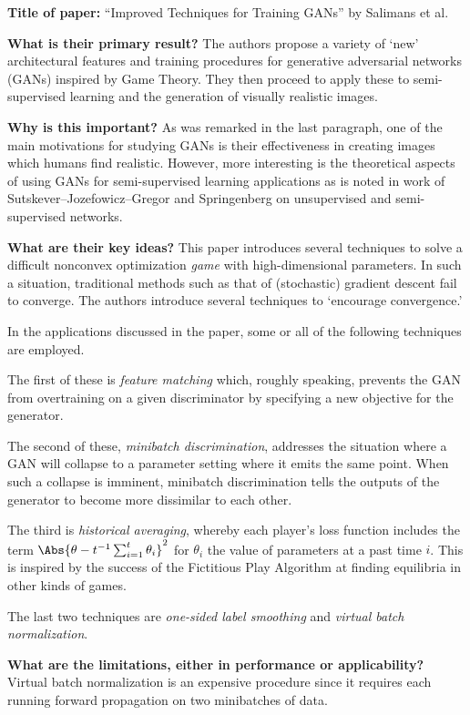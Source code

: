 \noindent \textbf{Title of paper:} ``Improved Techniques for Training GANs'' by
Salimans et al.

\noindent\textbf{What is their primary result?} The authors propose a variety of
`new' architectural features and training procedures for generative adversarial
networks (GANs) inspired by Game Theory. They then proceed to apply these to
semi-supervised learning and the generation of visually realistic images.

\noindent\textbf{Why is this important?} As was remarked in the last paragraph,
one of the main motivations for studying GANs is their effectiveness in creating
images which humans find realistic. However, more interesting is the theoretical
aspects of using GANs for semi-supervised learning applications as is noted in
work of Sutskever--Jozefowicz--Gregor and Springenberg on unsupervised and
semi-supervised networks.

\noindent\textbf{What are their key ideas?} This paper introduces several
techniques to solve a difficult nonconvex optimization \emph{game} with
high-dimensional parameters. In such a situation, traditional methods such as
that of (stochastic) gradient descent fail to converge. The authors introduce
several techniques to `encourage convergence.'

In the applications discussed in the paper, some or all of the following
techniques are employed.

The first of these is \emph{feature matching} which, roughly speaking, prevents
the GAN from overtraining on a given discriminator by specifying a new objective
for the generator.

The second of these, \emph{minibatch discrimination}, addresses the situation
where a GAN will collapse to a parameter setting where it emits the same point.
When such a collapse is imminent, minibatch discrimination tells the outputs of
the generator to become more dissimilar to each other.

The third is \emph{historical averaging}, whereby each player's loss function
includes the term $\Abs{\theta-t^{-1}\sum_{i=1}^t\theta_i}^2$ for $\theta_i$ the
value of parameters at a past time $i$. This is inspired by the success of the
Fictitious Play Algorithm at finding equilibria in other kinds of games.

The last two techniques are \emph{one-sided label smoothing} and \emph{virtual
  batch normalization}.

\noindent\textbf{What are the limitations, either in performance or
  applicability?} Virtual batch normalization is an expensive procedure since it
requires each running forward propagation on two minibatches of data.

